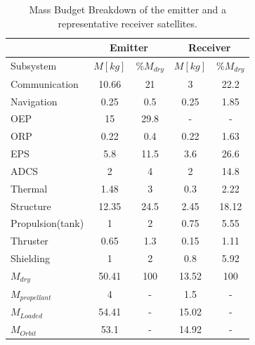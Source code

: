 \begin{table}[ht!]
\centering
\begin{tabular}{|l|c|c|c|c|}
\hline
 & \multicolumn{2}{|c|}{Emitter} & \multicolumn{2}{|c|}{Receiver} \\\hline
 Subsystem        & $M [kg]$ & \%$M_{dry}$ & $M [kg]$ & \%$M_{dry}$ \\\hline\hline
 Communication    & 10.66    & 21          & 3        & 22.2 \\\hline
 Navigation       & 0.25     & 0.5         & 0.25     & 1.85 \\\hline
 OEP              & 15       & 29.8        & -        & - \\\hline
 ORP              & 0.22     & 0.4         & 0.22     & 1.63 \\\hline
 EPS              & 5.8      & 11.5        & 3.6      & 26.6 \\\hline
 ADCS             & 2        & 4           & 2        & 14.8 \\\hline
 Thermal          & 1.48     & 3           & 0.3      & 2.22 \\\hline
 Structure        & 12.35    & 24.5        & 2.45     & 18.12 \\\hline
 Propulsion(tank) & 1        & 2           & 0.75     & 5.55 \\\hline
 Thruster         & 0.65     & 1.3         & 0.15     & 1.11 \\\hline
 Shielding        & 1        & 2           & 0.8      & 5.92 \\\hline\hline
 $M_{dry}$        & 50.41    & 100         & 13.52    & 100 \\\hline
 $M_{propellant}$ & 4        & -           & 1.5      & - \\\hline
 $M_{Loaded}$     & 54.41    & -           & 15.02    & - \\\hline
 $M_{Orbit}$      & 53.1     & -           & 14.92    & - \\\hline
\end{tabular}
\caption{Mass Budget Breakdown of the emitter and a representative receiver satellites.}
\label{tab:MB}
\end{table}

